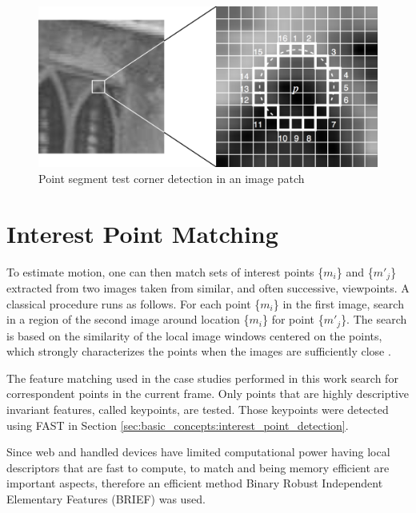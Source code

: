 \begin{figure}[!htb]
  \centering
  \includegraphics[width=\linewidth]{chapters/basic_concepts/fast.png}
  \caption{Point segment test corner detection in an image patch \cite{Glass2013}}
  \label{figure:fast}
\end{figure}


\section{Interest Point Matching} %
\label{sec:basic_concepts:interest_point_matching}

To estimate motion, one can then match sets of interest points \{$m_{i}$\} and \{$m'_{j}$\} extracted from two images taken from similar, and often successive, viewpoints. A classical procedure \cite{Calonder2010} runs as follows. For each point \{$m_{i}$\} in the first image, search in a region of the second image around location \{$m_{i}$\} for point \{$m'_{j}$\}. The search is based on the similarity of the local image windows centered on the points, which strongly characterizes the points when the images are sufficiently close \cite{Lepetit2005}.

The feature matching used in the case studies performed in this work search for correspondent points in the current frame. Only points that are highly descriptive invariant features, called keypoints, are tested. Those keypoints were detected using FAST \cite{Rosten2010} in Section \ref{sec:basic_concepts:interest_point_detection}.

Since web and handled devices have limited computational power having local descriptors that are fast to compute, to match and being memory efficient are important aspects, therefore an efficient method Binary Robust Independent Elementary Features (BRIEF) \cite{Calonder2010} was used.

